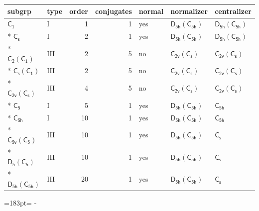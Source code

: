 \documentclass[10pt,a4paper]{article}
\newcommand{\needspace}[1]{\par\penalty-100\begingroup\dimen0=#1\relax\dimen2=\pagegoal
  \advance\dimen2-\pagetotal\ifdim\dimen0>\dimen2\relax\ifdim\dimen2>0pt\vfil\break\fi\fi
  \endgroup}
\numberwithin{equation}{section}
\newcommand{\grp}[1]{\mathsf{#1}}
\begin{document}
{\small\begin{longtable}{@{}llrrlll@{}}\toprule
subgrp & type & order & conjugates & normal & normalizer & centralizer\\\midrule\endhead
\bottomrule\endfoot\endlastfoot
\href{../../../rotation/data/pdf/C1.pdf}{$\grp{C_{1}}$} & I & 1 & 1 & yes & \href{D5h-C5h.pdf}{$\grp{D_{5h}}(\grp{C_{5h}})$} & \href{D5h-C5h.pdf}{$\grp{D_{5h}}(\grp{C_{5h}})$}\\*
\href{../../../rotation/data/pdf/C1v.pdf}{$\grp{C_{s}}$} & I & 2 & 1 & yes & \href{D5h-C5h.pdf}{$\grp{D_{5h}}(\grp{C_{5h}})$} & \href{D5h-C5h.pdf}{$\grp{D_{5h}}(\grp{C_{5h}})$}\\*
\href{C2-C1.pdf}{$\grp{C_{2}}(\grp{C_{1}})$} & III & 2 & 5 & no & \href{C2v-C1v.pdf}{$\grp{C_{2v}}(\grp{C_{s}})$} & \href{C2v-C1v.pdf}{$\grp{C_{2v}}(\grp{C_{s}})$}\\*
\href{C1v-C1.pdf}{$\grp{C_{s}}(\grp{C_{1}})$} & III & 2 & 5 & no & \href{C2v-C1v.pdf}{$\grp{C_{2v}}(\grp{C_{s}})$} & \href{C2v-C1v.pdf}{$\grp{C_{2v}}(\grp{C_{s}})$}\\*
\href{C2v-C1v.pdf}{$\grp{C_{2v}}(\grp{C_{s}})$} & III & 4 & 5 & no & \href{C2v-C1v.pdf}{$\grp{C_{2v}}(\grp{C_{s}})$} & \href{C2v-C1v.pdf}{$\grp{C_{2v}}(\grp{C_{s}})$}\\*
\href{../../../rotation/data/pdf/C5.pdf}{$\grp{C_{5}}$} & I & 5 & 1 & yes & \href{D5h-C5h.pdf}{$\grp{D_{5h}}(\grp{C_{5h}})$} & \href{../../../rotation/data/pdf/C5h.pdf}{$\grp{C_{5h}}$}\\*
\href{../../../rotation/data/pdf/C5h.pdf}{$\grp{C_{5h}}$} & I & 10 & 1 & yes & \href{D5h-C5h.pdf}{$\grp{D_{5h}}(\grp{C_{5h}})$} & \href{../../../rotation/data/pdf/C5h.pdf}{$\grp{C_{5h}}$}\\*
\href{C5v-C5.pdf}{$\grp{C_{5v}}(\grp{C_{5}})$} & III & 10 & 1 & yes & \href{D5h-C5h.pdf}{$\grp{D_{5h}}(\grp{C_{5h}})$} & \href{../../../rotation/data/pdf/C1v.pdf}{$\grp{C_{s}}$}\\*
\href{D5-C5.pdf}{$\grp{D_{5}}(\grp{C_{5}})$} & III & 10 & 1 & yes & \href{D5h-C5h.pdf}{$\grp{D_{5h}}(\grp{C_{5h}})$} & \href{../../../rotation/data/pdf/C1v.pdf}{$\grp{C_{s}}$}\\*
\href{D5h-C5h.pdf}{$\grp{D_{5h}}(\grp{C_{5h}})$} & III & 20 & 1 & yes & \href{D5h-C5h.pdf}{$\grp{D_{5h}}(\grp{C_{5h}})$} & \href{../../../rotation/data/pdf/C1v.pdf}{$\grp{C_{s}}$}\\
\bottomrule\end{longtable}}
\needspace{183pt}
\end{document}
